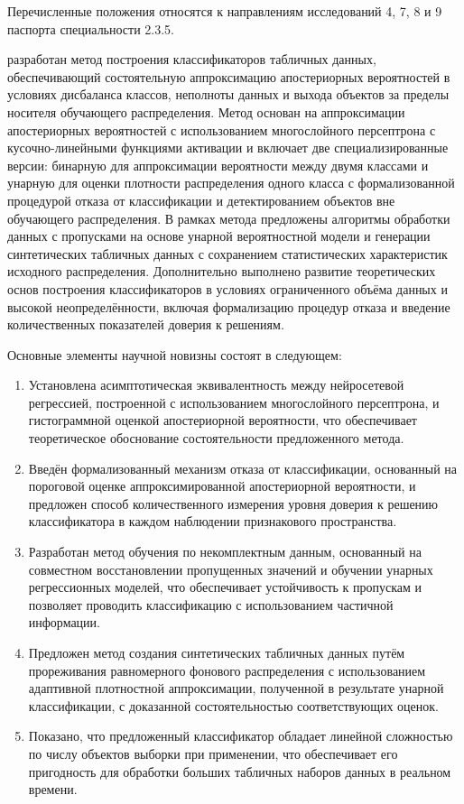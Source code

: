 Перечисленные положения относятся к направлениям исследований 4, 7, 8 и 9 паспорта специальности 2.3.5.

{\novelty} разработан метод построения классификаторов табличных данных, обеспечивающий состоятельную аппроксимацию апостериорных вероятностей в условиях дисбаланса классов, неполноты данных и выхода объектов за пределы носителя обучающего распределения. Метод основан на аппроксимации апостериорных вероятностей с использованием многослойного персептрона с кусочно-линейными функциями активации и включает две специализированные версии: бинарную для аппроксимации вероятности между двумя классами и унарную для оценки плотности распределения одного класса с формализованной процедурой отказа от классификации и детектированием объектов вне обучающего распределения. В рамках метода предложены алгоритмы обработки данных с пропусками на основе унарной вероятностной модели и генерации синтетических табличных данных с сохранением статистических характеристик исходного распределения. Дополнительно выполнено развитие теоретических основ построения классификаторов в условиях ограниченного объёма данных и высокой неопределённости, включая формализацию процедур отказа и введение количественных показателей доверия к решениям.

Основные элементы научной новизны состоят в следующем:

\begin{enumerate}[beginpenalty=10000] %
  \item Установлена асимптотическая эквивалентность между нейросетевой регрессией, построенной с использованием многослойного персептрона, и гистограммной оценкой апостериорной вероятности, что обеспечивает теоретическое обоснование состоятельности предложенного метода.
  \item Введён формализованный механизм отказа от классификации, основанный на пороговой оценке аппроксимированной апостериорной вероятности, и предложен способ количественного измерения уровня доверия к решению классификатора в каждом наблюдении признакового пространства.
  \item Разработан метод обучения по некомплектным данным, основанный на совместном восстановлении пропущенных значений и обучении унарных регрессионных моделей, что обеспечивает устойчивость к пропускам и позволяет проводить классификацию с использованием частичной информации.
  \item Предложен метод создания синтетических табличных данных путём прореживания равномерного фонового распределения с использованием адаптивной плотностной аппроксимации, полученной в результате унарной классификации, с доказанной состоятельностью соответствующих оценок.
  \item Показано, что предложенный классификатор обладает линейной сложностью по числу объектов выборки при применении, что обеспечивает его пригодность для обработки больших табличных наборов данных в реальном времени.
\end{enumerate}

